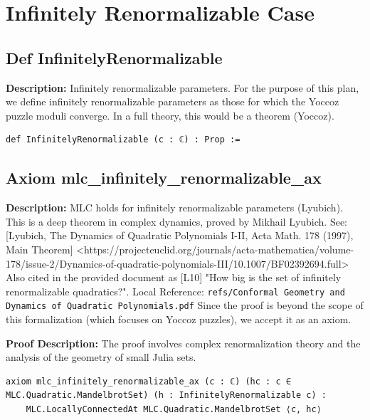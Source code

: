 \section{Infinitely Renormalizable Case}

\subsection*{Def InfinitelyRenormalizable}
\textbf{Description:} Infinitely renormalizable parameters.
    For the purpose of this plan, we define infinitely renormalizable parameters
    as those for which the Yoccoz puzzle moduli converge.
    In a full theory, this would be a theorem (Yoccoz).

\begin{lstlisting}[language=Lean]
def InfinitelyRenormalizable (c : ℂ) : Prop :=
\end{lstlisting}

\subsection*{Axiom mlc\_infinitely\_renormalizable\_ax}
\textbf{Description:} MLC holds for infinitely renormalizable parameters (Lyubich).
    This is a deep theorem in complex dynamics, proved by Mikhail Lyubich.
    See: [Lyubich, The Dynamics of Quadratic Polynomials I-II, Acta Math. 178 (1997), Main Theorem] <https://projecteuclid.org/journals/acta-mathematica/volume-178/issue-2/Dynamics-of-quadratic-polynomials-III/10.1007/BF02392694.full>
    Also cited in the provided document as [L10] "How big is the set of infinitely renormalizable quadratics?".
    Local Reference: \texttt{refs/Conformal Geometry and Dynamics of Quadratic Polynomials.pdf}
    Since the proof is beyond the scope of this formalization (which focuses on Yoccoz puzzles),
    we accept it as an axiom.

\textbf{Proof Description:} The proof involves complex renormalization theory and the analysis of the
    geometry of small Julia sets.

\begin{lstlisting}[language=Lean]
axiom mlc_infinitely_renormalizable_ax (c : ℂ) (hc : c ∈ MLC.Quadratic.MandelbrotSet) (h : InfinitelyRenormalizable c) :
    MLC.LocallyConnectedAt MLC.Quadratic.MandelbrotSet ⟨c, hc⟩
\end{lstlisting}

